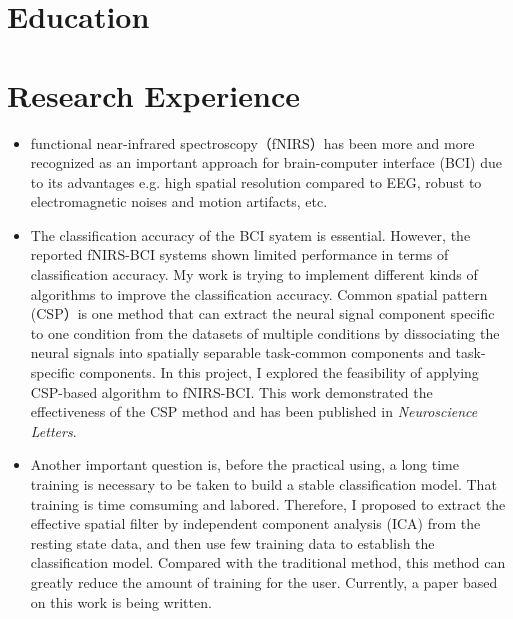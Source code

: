 \documentclass[11pt,a4paper,sans]{moderncv} %
\begin{document}
\makecvtitle %
\section{Education}

\section{Research Experience}
{
\begin{itemize}
\item functional near-infrared spectroscopy（fNIRS）has been more and more recognized as an important approach for brain-computer interface (BCI) due to its advantages e.g. high spatial resolution compared to EEG, robust to electromagnetic noises and motion artifacts, etc.
\item The classification accuracy of the BCI syatem is essential. However, the reported fNIRS-BCI systems shown limited performance in terms of classification accuracy. My work is trying to implement different kinds of algorithms to improve the classification accuracy. Common spatial pattern (CSP）is one method that can extract the neural signal component specific to one condition from the datasets of multiple conditions by dissociating the neural signals into spatially separable task-common components and task-specific components. In this project, I explored the feasibility of applying CSP-based algorithm to fNIRS-BCI. This work demonstrated the effectiveness of the CSP method and has been published in \emph{Neuroscience Letters}.
\item Another important question is, before the practical using, a long time training is necessary to be taken to build a stable classification model. That training is time comsuming and labored. Therefore, I proposed to extract the effective spatial filter by independent component analysis (ICA) from the resting state data, and then use few training data to establish the classification model. Compared with the traditional method, this method can greatly reduce the amount of training for the user. Currently, a paper based on this work is being written.
\end{itemize}
}
\end{document}
